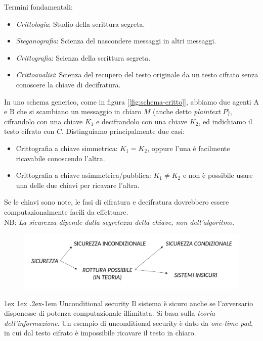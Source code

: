\documentclass[a4paper, 11pt, twoside, openright, fleqn]{report}
\makeatletter
\renewcommand{\paragraph}{%
	\@startsection{paragraph}{4}%
	{\z@}{1ex \@plus 1ex \@minus .2ex}{-1em}%
	{\normalfont\normalsize\bfseries}%
}
\makeatother
\begin{document}
\noindent Termini fondamentali:
\begin{itemize}
	\item \emph{Crittologia}: Studio della scrittura segreta.
	\item \emph{Steganografia}: Scienza del nascondere messaggi in altri messaggi.
	\item \emph{Crittografia}: Scienza della scrittura segreta.
	\item \emph{Crittoanalisi}: Scienza del recupero del testo originale da un testo cifrato senza conoscere la chiave di decifratura.
\end{itemize}
In uno schema generico, come in figura [\ref{fig:schema-critto}], abbiamo due agenti A e B che si scambiano un messaggio in chiaro $M$ (anche detto \emph{plaintext} $P$), cifrandolo con una chiave $K_1$ e decifrandolo con una chiave $K_2$, ed indichiamo il testo cifrato con $C$. Distinguiamo principalmente due casi:
\begin{itemize}
	\item Crittografia a chiave simmetrica: $K_1 = K_2$, oppure l'una è facilmente ricavabile conoscendo l'altra.
	\item Crittografia a chiave asimmetrica/pubblica: $K_1 \neq K_2$ e non è possibile usare una delle due chiavi per ricavare l'altra.
\end{itemize}
Se le chiavi sono note, le fasi di cifratura e decifratura dovrebbero essere computazionalmente facili da effettuare.\\
NB: \emph{La sicurezza dipende dalla segretezza della chiave, non dell'algoritmo}.

\begin{figure}[htp]
	\centering
	\includegraphics[width=.8\textwidth]{images/Sicurezza_incondizionale.png}
\end{figure}

\paragraph{Unconditional security} Il sistema è sicuro anche se l'avversario disponesse di potenza computazionale illimitata. Si basa sulla \emph{teoria dell'informazione}. Un esempio di unconditional security è dato da \emph{one-time pad}, in cui dal testo cifrato è impossibile ricavare il testo in chiaro.
\end{document}
